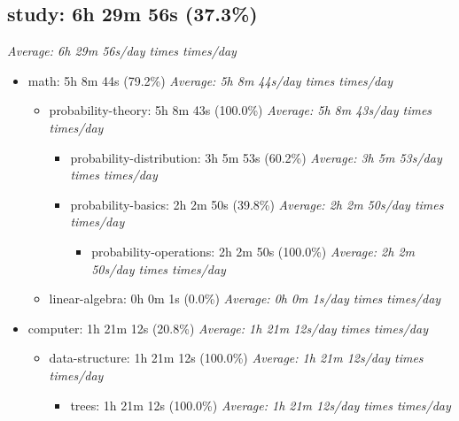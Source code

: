 \documentclass[12pt]{extarticle}
\begin{document}
{\fontsize{16}{19.2}\selectfont\subsection*{study: 6h 29m 56s (37.3\%)}}
\textit{Average: 6h 29m 56s/day  times  times/day}\par
\begin{itemize}[topsep=0pt, itemsep=-0.5ex]
    \item math: 5h 8m 44s (79.2\%)
        \textit{Average: 5h 8m 44s/day  times  times/day}\par
\begin{itemize}[topsep=0pt, itemsep=-0.5ex]
    \item probability-theory: 5h 8m 43s (100.0\%)
        \textit{Average: 5h 8m 43s/day  times  times/day}\par
\begin{itemize}[topsep=0pt, itemsep=-0.5ex]
    \item probability-distribution: 3h 5m 53s (60.2\%)
        \textit{Average: 3h 5m 53s/day  times  times/day}\par
    \item probability-basics: 2h 2m 50s (39.8\%)
        \textit{Average: 2h 2m 50s/day  times  times/day}\par
\begin{itemize}[topsep=0pt, itemsep=-0.5ex]
    \item probability-operations: 2h 2m 50s (100.0\%)
        \textit{Average: 2h 2m 50s/day  times  times/day}\par
\end{itemize}
\end{itemize}
    \item linear-algebra: 0h 0m 1s (0.0\%)
        \textit{Average: 0h 0m 1s/day  times  times/day}\par
\end{itemize}
    \item computer: 1h 21m 12s (20.8\%)
        \textit{Average: 1h 21m 12s/day  times  times/day}\par
\begin{itemize}[topsep=0pt, itemsep=-0.5ex]
    \item data-structure: 1h 21m 12s (100.0\%)
        \textit{Average: 1h 21m 12s/day  times  times/day}\par
\begin{itemize}[topsep=0pt, itemsep=-0.5ex]
    \item trees: 1h 21m 12s (100.0\%)
        \textit{Average: 1h 21m 12s/day  times  times/day}\par
\end{itemize}
\end{itemize}
\end{itemize}
\end{document}

